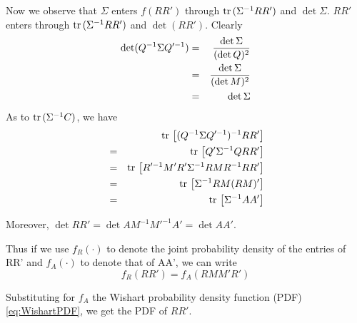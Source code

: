 \documentclass{report}
\begin{document}
Now we observe that $\Sigma$ enters $f(RR')$ through $\text{tr}\, (\Sigma^{-1}
RR')$ and $\det \Sigma$. $RR'$ enters through $\text{tr}\, (\Sigma^{-1}
RR')$ and $\det (RR')$. Clearly
\begin{eqnarray*}
  \det (Q^{-1}\Sigma Q'^{-1}) &=& \det \Sigma \over (\det Q)^2 \\
  &=& \det \Sigma \over (\det M)^2 \\
  &=& \det \Sigma
\end{eqnarray*}
As to $\text{tr}\, (\Sigma^{-1} C)$, we have
\begin{eqnarray*}
  && \text{tr}\,\left[(Q^{-1}\Sigma Q'^{-1})^{-1} RR'\right] \\
  &=& \text{tr}\,\left[Q'\Sigma^{-1} Q RR'\right] \\
  &=& \text{tr}\,\left[ R'^{-1}M'R'\Sigma^{-1} RMR^{-1} RR'\right] \\
  &=& \text{tr}\,\left[ \Sigma^{-1} RM (RM)'\right] \\
  &=& \text{tr}\,\left[ \Sigma^{-1} AA'\right] \\
\end{eqnarray*}

Moreover, $\det RR' = \det AM^{-1} M'^{-1} A' = \det AA'$.

Thus if we use $f_R(\cdot)$ to denote the joint probability density of
the entries of RR' and $f_A(\cdot)$ to denote that of AA', we can
write
\begin{equation}\label{eq:cross-corr-matrix-PDF}
  f_R(RR') = f_A(RMM'R')
\end{equation}

Substituting for $f_A$ the Wishart probability density function (PDF)
\ref{eq:WishartPDF}, we get the PDF of $RR'$.



\end{document}
